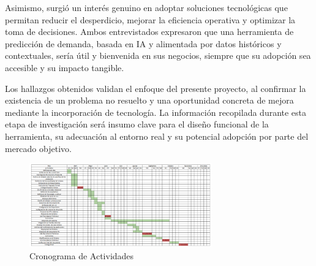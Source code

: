 \indent Asimismo, surgió un interés genuino en adoptar soluciones tecnológicas que permitan reducir el desperdicio, mejorar la eficiencia operativa y optimizar la toma de decisiones. Ambos entrevistados expresaron que una herramienta de predicción de demanda, basada en IA y alimentada por datos históricos y contextuales, sería útil y bienvenida en sus negocios, siempre que su adopción sea accesible y su impacto tangible.

\indent Los hallazgos obtenidos validan el enfoque del presente proyecto, al confirmar la existencia de un problema no resuelto y una oportunidad concreta de mejora mediante la incorporación de tecnología. La información recopilada durante esta etapa de investigación será insumo clave para el diseño funcional de la herramienta, su adecuación al entorno real y su potencial adopción por parte del mercado objetivo.

\newpage %



\begin{figure}[h]
    \centering
    \includegraphics[width=0.7\textwidth]{images/cronograma.png}
    \caption{Cronograma de Actividades}
    \label{fig:cronograma}
\end{figure}
